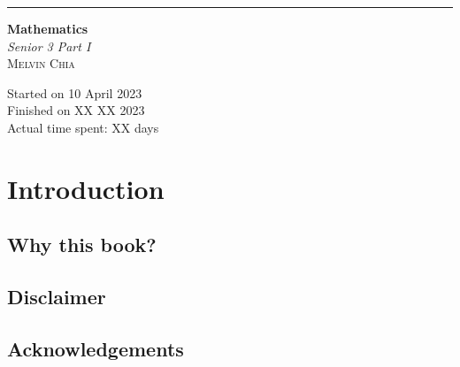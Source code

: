 \documentclass[12pt]{report}
\begin{document}
\newcommand{\sol}[1]{

  \noindent \textbf{Sol.}
}
\newcommand{\prooff}[1]{

  \noindent \textbf{Proof.}
}

\newcommand{\sxrightarrow}[2][]{%
  \mathrel{\text{$\xrightarrow[#1]{#2}$}}%
}

\newenvironment{cequation}{
  \makeatletter
  \setbool{@fleqn}{false}
  \makeatother
  \begin{equation*}
    }{\end{equation*}}

\begin{titlepage}
  \raggedleft{}
  \rule{1pt}{\textheight}
  \hspace{0.02\textwidth}
  \parbox[b]{0.75\textwidth}{

  {\fontsize{40}{60}\selectfont\bfseries Mathematics}\\[2\baselineskip]
  {\huge\textit{Senior 3 Part I}}\\[4\baselineskip]
  {\Large\textsc{Melvin Chia}}

  \vspace{0.5\textheight}

  {\noindent Started on 10 April 2023}\\[\baselineskip]
  {\noindent Finished on XX XX 2023}\\[\baselineskip]
  {\noindent Actual time spent: XX days}\\[\baselineskip]}

\end{titlepage}

\chapter*{Introduction}
 

\doublespacing{}
\section*{Why this book?}

\section*{Disclaimer}
\section*{Acknowledgements}

\singlespacing{}
\end{document}

